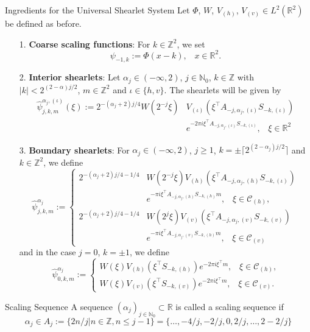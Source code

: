 \begin{frame}
\begin{block}{Ingredients for the Universal Shearlet System}
Let $\Phi$, $W$, $V_{(h)}$, $V_{(v)}\in L^2(\mathbb{R}^2)$ be defined as before.
\begin{enumerate}
\item[1.] \textbf{Coarse scaling functions}: For $k\in\mathbb{Z}^2$, we set 
$$
\psi_{-1,k}:=\Phi(x-k)\textrm{,}\quad x\in\mathbb{R}^2.
$$
\item[2.] \textbf{Interior shearlets}: Let $\alpha_j\in (-\infty,2)$, $j\in\mathbb{N}_0$, $k\in\mathbb{Z}$ with $|k|< 2^{(2-\alpha)j/2}$, $m\in\mathbb{Z}^2$ and $\iota\in\{h,v\}$. The shearlets will be given by 
\small
$$
\begin{aligned}
\hat{\psi}^{\alpha_j,(\iota)}_{j,k,m}(\xi):=2^{-(\alpha_j+2)j/4}W(2^{-j}\xi)&V_{(\iota)}(\xi^{\top} A_{-j,\alpha_j,(\iota)}S_{-k,(\iota)})\\
&e^{-2\pi i\xi^{\top}A_{-j,\alpha_j,(\iota)}S_{-k,(\iota)}}\textrm{,}\quad \xi\in\mathbb{R}^2
\end{aligned}
$$
\end{enumerate}
\end{block}
\end{frame}

\begin{frame}
\begin{block}{}
\begin{enumerate}
\item[3.] \textbf{Boundary shearlets}: For $\alpha_j \in(-\infty,2)$, $j\geq 1$, $k=\pm\lceil 2^{(2-\alpha_j)j/2}\rceil$ and $k\in\mathbb{Z}^2$, we define
$$
\hat{\psi}_{j,k,m}^{\alpha_j}:=
\begin{cases}
2^{-(\alpha_j+2)j/4-1/4}&W(2^{-j}\xi)V_{(h)}(\xi^{\top} A_{-j,\alpha_j,(h)}S_{-k,(\iota)})\\
&e^{-\pi i\xi^{\top}A_{-j,\alpha_j,(h)}S_{-k,(h)}m}\textrm{,}\quad \xi\in\mathcal{C}_{(h)},\\
2^{-(\alpha_j+2)j/4-1/4}&W(2^{j}\xi)V_{(v)}(\xi^{\top}A_{-j,\alpha_j,(v)}S_{-k,(v)})\\
&e^{-\pi i\xi^{\top}A_{-j,\alpha_j,(v)}S_{-k,(h)}m}\textrm{,}\quad \xi\in\mathcal{C}_{(v)}
\end{cases}
$$
and in the case $j=0$, $k=\pm 1$, we define
$$
\hat{\psi}^{\alpha_j}_{0,k,m}:=
\begin{cases}
W(\xi) V_{(h)}(\xi^{\top}S_{-k,(h)})e^{-2\pi i\xi^{\top}m}\textrm{,}\quad \xi\in\mathcal{C}_{(h)}\textrm{,}\\
W(\xi)V_{(v)}(\xi^{\top}S_{-k,(v)})e^{-2\pi i\xi^{\top}m}\textrm{,}\quad \xi\in\mathcal{C}_{(v)}.
\end{cases}
$$
\end{enumerate}
\end{block}

\pause
\begin{block}{Scaling Sequence}
A sequence $(\alpha_j)_{j\in\mathbb{N}_0}\subset \mathbb{R}$ is called a scaling sequence if
$$
\alpha_j\in A_j:=\{2n/j| n\in\mathbb{Z},n\leq j-1\}=\{\ldots,-4/j,-2/j,0,2/j,\ldots,2-2/j\}
$$
\end{block}
\end{frame}

